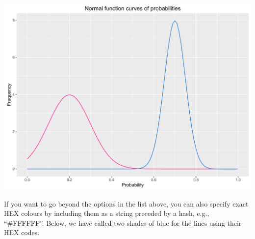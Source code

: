 \begin{Shaded}
\begin{Highlighting}[]
\StringTok{ }\NormalTok{(}\NormalTok{(} \NormalTok{(}\NormalTok{, }\NormalTok{)), }\NormalTok{(} 
\StringTok{      }\NormalTok{(}  \NormalTok{(}\NormalTok{, }\NormalTok{),}
\StringTok{        } \NormalTok{) +}
\StringTok{      }\NormalTok{(}  \NormalTok{(}\NormalTok{, }\NormalTok{),}
\StringTok{        } \NormalTok{) +}
\StringTok{      }\NormalTok{(} \NormalTok{,} \NormalTok{(}\NormalTok{, }\NormalTok{, }\NormalTok{),}
\StringTok{        }\NormalTok{(}\NormalTok{, }\NormalTok{)) +}
\StringTok{      }\NormalTok{(} \NormalTok{) +}
\StringTok{      }\NormalTok{(}\NormalTok{)}
\end{Highlighting}
\end{Shaded}

\begin{center}\includegraphics[width=0.55\linewidth]{figures/function_8-1} \end{center}

If you want to go beyond the options in the list above, you can also
specify exact HEX colours by including them as a string preceded by a
hash, e.g., ``\#FFFFFF''. Below, we have called two shades of blue for
the lines using their HEX codes.

